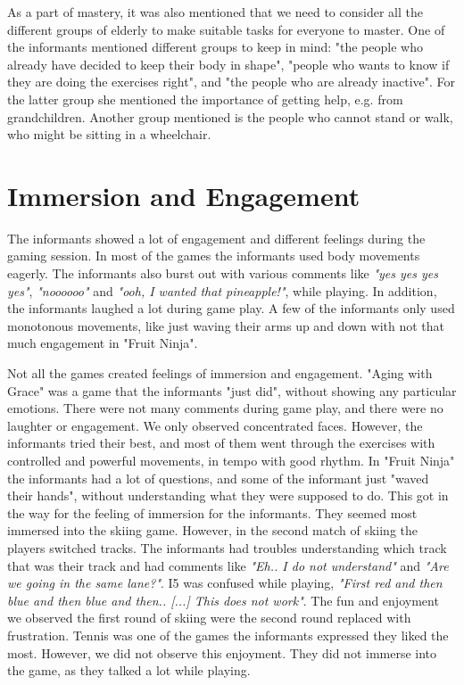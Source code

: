 As a part of mastery, it was also mentioned that we need to consider all the different groups of elderly to make suitable tasks for everyone to master. One of the informants mentioned different groups to keep in mind: "the people who already have decided to keep their body in shape", "people who wants to know if they are doing the exercises right", and "the people who are already inactive". For the latter group she mentioned the importance of getting help, e.g. from grandchildren.  Another group mentioned is the people who cannot stand or walk, who might be sitting in a wheelchair.

\section{Immersion and Engagement}
The informants showed a lot of engagement and different feelings during the gaming session. In most of the games the informants used body movements eagerly. The informants also burst out with various comments like \emph{"yes yes yes yes"}, \emph{"noooooo"} and \emph{"ooh, I wanted that pineapple!"}, while playing. In addition, the informants laughed a lot during game play. A few of the informants only used monotonous movements, like just waving their arms up and down with not that much engagement in "Fruit Ninja".  

Not all the games created feelings of immersion and engagement. "Aging with Grace" was a game that the informants "just did", without showing any particular emotions. There were not many comments during game play, and there were no laughter or engagement. We only observed concentrated faces. However, the informants tried their best, and most of them went through the exercises with controlled and powerful movements, in tempo with good rhythm. In "Fruit Ninja" the informants had a lot of questions, and some of the informant just "waved their hands", without understanding what they were supposed to do. This got in the way for the feeling of immersion for the informants. They seemed most immersed into the skiing game. However, in the second match of skiing the players switched tracks. The informants had troubles understanding which track that was their track and had comments like \emph{"Eh.. I do not understand"} and \emph{"Are we going in the same lane?"}. I5 was confused while playing, \emph{"First red and then blue and then blue and then.. [...] This does not work"}. The fun and enjoyment we observed the first round of skiing were the second round replaced with frustration. Tennis was one of the games the informants expressed they liked the most. However, we did not observe this enjoyment. They did not immerse into the game, as they talked a lot while playing. 

